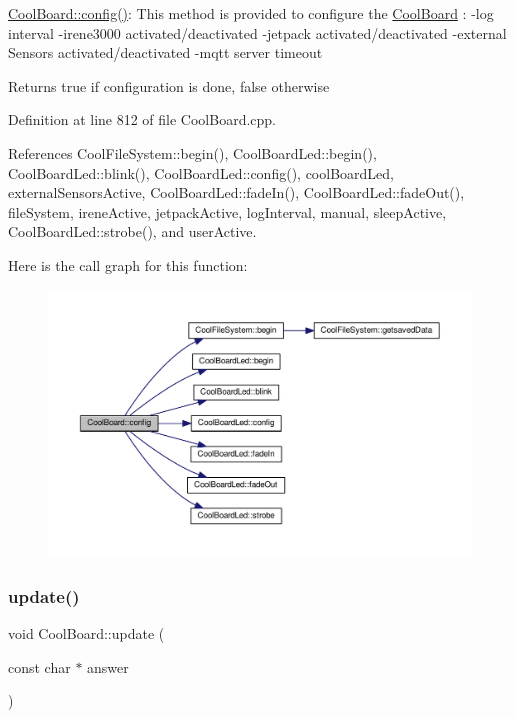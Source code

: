 \hyperlink{class_cool_board_a583a874c09c07e70a6eb9229fc4beddb}{Cool\+Board\+::config()}\+: This method is provided to configure the \hyperlink{class_cool_board}{Cool\+Board} \+: -\/log interval -\/irene3000 activated/deactivated -\/jetpack activated/deactivated -\/external Sensors activated/deactivated -\/mqtt server timeout

\begin{DoxyReturn}{Returns}
true if configuration is done, false otherwise 
\end{DoxyReturn}


Definition at line 812 of file Cool\+Board.\+cpp.



References Cool\+File\+System\+::begin(), Cool\+Board\+Led\+::begin(), Cool\+Board\+Led\+::blink(), Cool\+Board\+Led\+::config(), cool\+Board\+Led, external\+Sensors\+Active, Cool\+Board\+Led\+::fade\+In(), Cool\+Board\+Led\+::fade\+Out(), file\+System, irene\+Active, jetpack\+Active, log\+Interval, manual, sleep\+Active, Cool\+Board\+Led\+::strobe(), and user\+Active.

Here is the call graph for this function\+:\nopagebreak
\begin{figure}[H]
\begin{center}
\leavevmode
\includegraphics[width=350pt]{d7/df9/class_cool_board_a583a874c09c07e70a6eb9229fc4beddb_cgraph}
\end{center}
\end{figure}
\mbox{\label{class_cool_board_a8612756d3f73198cdde857a66f0fe690}} 
\subsubsection{\texorpdfstring{update()}{update()}}
{\footnotesize\ttfamily void Cool\+Board\+::update (\begin{DoxyParamCaption}\item[{const char $\ast$}]{answer }\end{DoxyParamCaption})}

